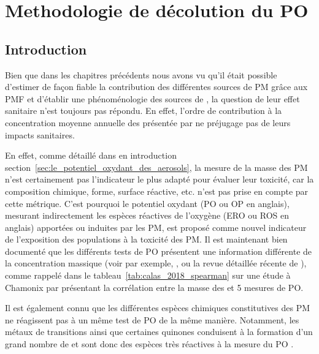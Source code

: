 \section{Methodologie de décolution du PO}%
\label{sec:methodologie_de_décolution_du_po}

\subsection{Introduction}

Bien que dans les chapitres précédents nous avons vu qu'il était possible d'estimer de
façon fiable la contribution des différentes sources de PM grâce aux PMF et d'établir une
phénoménologie des sources de \PMdix, la question de leur effet sanitaire n'est toujours
pas répondu. En effet, l'ordre de contribution à la concentration moyenne annuelle des
\PMdix{} présentée par \cite[(figure 3)]{weberComparison2019} ne préjugage pas de leurs
impacts sanitaires.

En effet, comme détaillé dans en introduction
section~\ref{sec:le_potentiel_oxydant_des_aerosols}, la mesure de la masse des PM n'est
certainement pas l'indicateur le plus adapté pour évaluer leur toxicité, car la composition
chimique, forme, surface réactive, etc. n'est pas prise en compte par cette métrique.
C'est pourquoi le potentiel oxydant (PO ou OP en anglais), mesurant indirectement les
espèces réactives de l'oxygène (ERO ou ROS en anglais) apportées ou induites par les PM,
est proposé comme nouvel indicateur de l'exposition des populations à la toxicité des PM. 
Il est maintenant bien documenté que les différents tests de PO présentent une information
différente de la concentration massique (voir par exemple,
\cite{choRedox2005,vermaReactive2014,batesReactive2015,fangOxidative2016,fangAmbient2017,calasSeasonal2019},
ou la revue détaillée récente de \cite{batesReview2019}), comme rappelé dans le
tableau~\ref{tab:calas_2018_spearman} sur une étude à Chamonix par
\cite{calasComparison2018} présentant la corrélation entre la masse des \PMdix{} et 5
mesures de PO.

Il est également connu que les différentes espèces chimiques constitutives des PM ne
réagissent pas à un même test de PO de la même manière. Notamment, les métaux de
transitions ainsi que certaines quinones conduisent à la formation d'un grand nombre de
 et sont donc des espèces très réactives à la mesure du PO
\autocite{charrierRates2015,calasImportance2017}.

